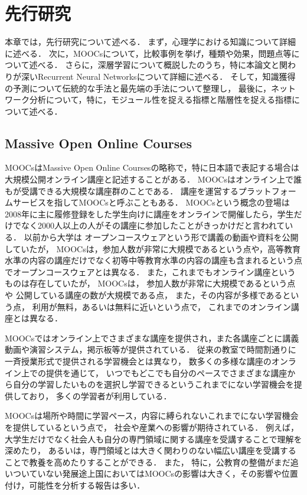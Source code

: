 \chapter{先行研究}
\label{chap:previous}
\fancyhf{}
\rhead{\thepage}
\cfoot{\thepage}

本章では，先行研究について述べる．
まず，心理学における知識について詳細に述べる．
次に，MOOCsについて，比較事例を挙げ，種類や効果，問題点等について述べる．
さらに，深層学習について概説したのうち，特に本論文と関わりが深いRecurrent Neural Networksについて詳細に述べる．
そして，知識獲得の予測について伝統的な手法と最先端の手法について整理し，
最後に，ネットワーク分析について，特に，モジュール性を捉える指標と階層性を捉える指標について述べる．


\section{Massive Open Online Courses}
MOOCsはMassive Open Online Courses\cite{mcauley2010mooc, pappano2012year,siemens2013massive}の略称で，特に日本語で表記する場合は大規模公開オンライン講座と記述することがある．
MOOCsはオンライン上で誰もが受講できる大規模な講座群のことである．
講座を運営するプラットフォームサービスを指してMOOCsと呼ぶこともある．
MOOCsという概念の登場は2008年に主に履修登録をした学生向けに講座をオンラインで開催したら，学生だけでなく2000人以上の人がその講座に参加したことがきっかけだと言われている\cite{yuan2013moocs}．
以前から大学は
オープンコースウェア\cite{abelson2008creation}という形で講義の動画や資料を公開していたが，
MOOCsは，参加人数が非常に大規模であるという点や，高等教育水準の内容の講座だけでなく初等中等教育水準の内容の講座も含まれるという点でオープンコースウェアとは異なる．
また，これまでもオンライン講座というものは存在していたが，
MOOCsは，
参加人数が非常に大規模であるという点や
公開している講座の数が大規模である点，
また，その内容が多様であるという点，
利用が無料，あるいは無料に近いという点で，
これまでのオンライン講座とは異なる．

MOOCsではオンライン上でさまざまな講座を提供され，また各講座ごとに講義動画や演習システム，掲示板等が提供されている．
従来の教室で時間割通りに一斉授業形式で提供される学習機会とは異なり，
数多くの多様な講座のオンライン上での提供を通じて，
いつでもどこでも自分のペースでさまざまな講座から自分の学習したいものを選択し学習できるというこれまでにない学習機会を提供しており，
多くの学習者が利用している．

MOOCsは場所や時間に学習ペース，内容に縛られないこれまでにない学習機会を提供しているという点で，
社会や産業への影響が期待されている．
例えば，大学生だけでなく社会人も自分の専門領域に関する講座を受講することで理解を深めたり，
あるいは，専門領域とは大きく関わりのない幅広い講座を受講することで教養を高めたりすることができる．
また，
特に，公教育の整備がまだ追いついていない発展途上国においてはMOOCsの影響は大きく，その影響や位置付け，可能性を分析する報告は多い\cite{trucano2013more,liyanagunawardena2013impact}．


